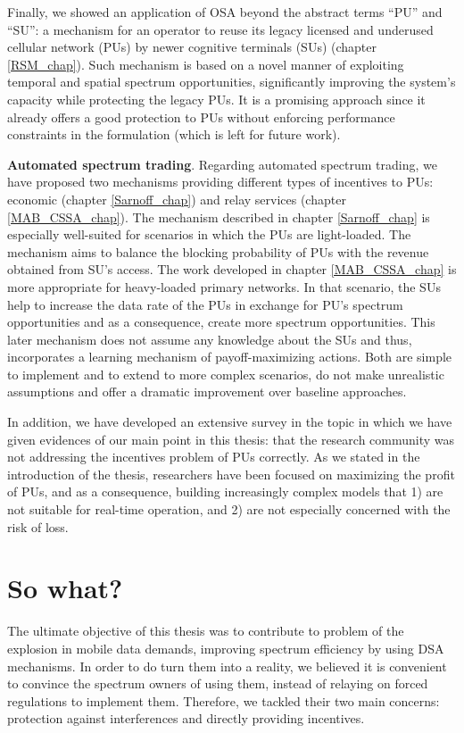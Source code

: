 Finally, we showed an application of OSA beyond the abstract terms \enquote{PU} and \enquote{SU}: a mechanism for an operator to reuse its legacy licensed and underused cellular network (PUs) by newer cognitive terminals (SUs) (chapter \ref{RSM_chap}). Such mechanism is based on a novel manner of exploiting temporal and spatial spectrum opportunities, significantly improving the system's capacity while protecting the legacy PUs. It is a promising approach since it already offers a good protection to PUs without enforcing performance constraints in the formulation (which is left for future work).

\textbf{Automated spectrum trading}. Regarding automated spectrum trading, we have proposed two mechanisms providing different types of incentives to PUs: economic (chapter \ref{Sarnoff_chap}) and relay services (chapter \ref{MAB_CSSA_chap}). The mechanism described in chapter \ref{Sarnoff_chap} is especially well-suited for scenarios in which the PUs are light-loaded. The mechanism aims to balance the blocking probability of PUs with the revenue obtained from SU's access. The work developed in chapter \ref{MAB_CSSA_chap} is more appropriate for heavy-loaded primary networks. In that scenario, the SUs help to increase the data rate of the PUs in exchange for PU's spectrum opportunities and as a consequence, create more spectrum opportunities. This later mechanism does not assume any knowledge about the SUs and thus, incorporates a learning mechanism of payoff-maximizing actions. Both are simple to implement and to extend to more complex scenarios, do not make unrealistic assumptions and offer a dramatic improvement over baseline approaches. %

In addition, we have developed an extensive survey in the topic in which we have given evidences of our main point in this thesis: that the research community was not addressing the incentives problem of PUs correctly. As we stated in the introduction of the thesis, researchers have been focused on maximizing the profit of PUs, and as a consequence, building increasingly complex models that 1) are not suitable for real-time operation, and 2) are not especially concerned with the risk of loss.

\section{So what?} %
The ultimate objective of this thesis was to contribute to problem of the explosion in mobile data demands, improving spectrum efficiency by using DSA mechanisms. In order to do turn them into a reality, we believed it is convenient to convince the spectrum owners of using them, instead of relaying on forced regulations to implement them. Therefore, we tackled their two main concerns: protection against interferences and directly providing incentives.

